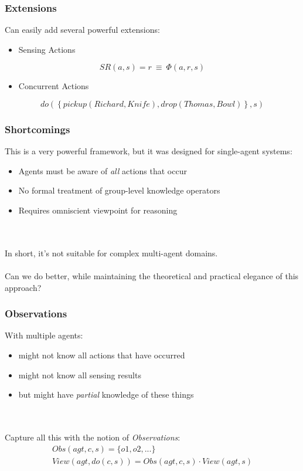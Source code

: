 \documentclass{beamer}
\begin{document}
\begin{frame}
\frametitle{Extensions}
Can easily add several powerful extensions:

\begin{itemize}
\item Sensing Actions
\end{itemize}
\begin{equation*}
SR(a,s)=r\ \equiv\ \Phi(a,r,s)
\end{equation*}

\begin{itemize}
\item Concurrent Actions
\end{itemize}
\begin{equation*}
  do(\left\{pickup(Richard,Knife),drop(Thomas,Bowl)\right\},s)
\end{equation*}
\end{frame}


\begin{frame}
\frametitle{Shortcomings}
This is a very powerful framework, but it was designed for single-agent systems:
\begin{itemize}
 \item Agents must be aware of \emph{all} actions that occur
 \item No formal treatment of group-level knowledge operators
 \item Requires omniscient viewpoint for reasoning
\end{itemize}
\ \\
\ \\
In short, it's not suitable for complex multi-agent domains.
\ \\
\ \\
Can we do better, while maintaining the theoretical and practical elegance
of this approach?
\end{frame}

\begin{frame}
\frametitle{Observations}

With multiple agents:
\begin{itemize}
\item might not know all actions that have occurred
\item might not know all sensing results
\item but might have \emph{partial} knowledge of these things
\end{itemize}
\ \\
\ \\
\pause
Capture all this with the notion of \emph{Observations}:
\begin{gather*}
  Obs(agt,c,s) = \{o1,o2,...\} \\
  View(agt,do(c,s)) = Obs(agt,c,s) \cdot View(agt,s)
\end{gather*}
\end{frame}
\end{document}
